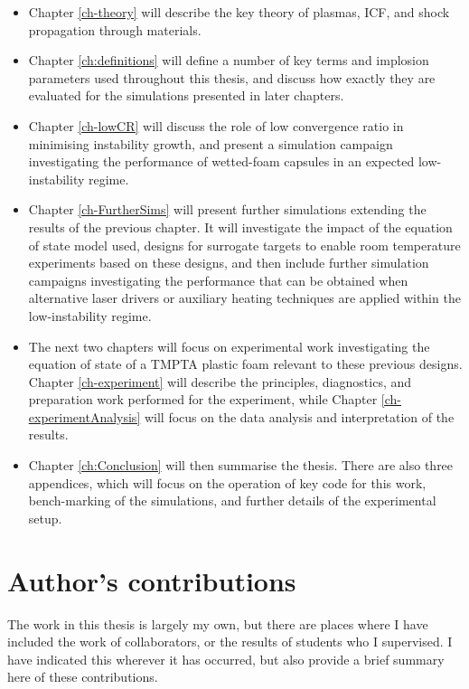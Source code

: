 \begin{itemize}
	\item Chapter \ref{ch-theory} will describe the key theory of plasmas, ICF, and shock propagation through materials.
	\item Chapter \ref{ch:definitions} will define a number of key terms and implosion parameters used throughout this thesis, and discuss how exactly they are evaluated for the simulations presented in later chapters.
	\item Chapter \ref{ch-lowCR} will discuss the role of low convergence ratio in minimising instability growth, and present a simulation campaign investigating the performance of wetted-foam capsules in an expected low-instability regime.
	\item Chapter \ref{ch-FurtherSims} will present further simulations extending the results of the previous chapter. It will investigate the impact of the equation of state model used, designs for surrogate targets to enable room temperature experiments based on these designs, and then include further simulation campaigns investigating the performance that can be obtained when alternative laser drivers or auxiliary heating techniques are applied within the low-instability regime.
	\item The next two chapters will focus on experimental work investigating the equation of state of a TMPTA plastic foam relevant to these previous designs. Chapter \ref{ch-experiment} will describe the principles, diagnostics, and preparation work performed for the experiment, while Chapter \ref{ch-experimentAnalysis} will focus on the data analysis and interpretation of the results.
	\item Chapter \ref{ch:Conclusion} will then summarise the thesis. There are also three appendices, which will focus on the operation of key code for this work, bench-marking of the simulations, and further details of the experimental setup.
\end{itemize}

\section{Author's contributions}

The work in this thesis is largely my own, but there are places where I have included the work of collaborators, or the results of students who I supervised. I have indicated this wherever it has occurred, but also provide a brief summary here of these contributions.

